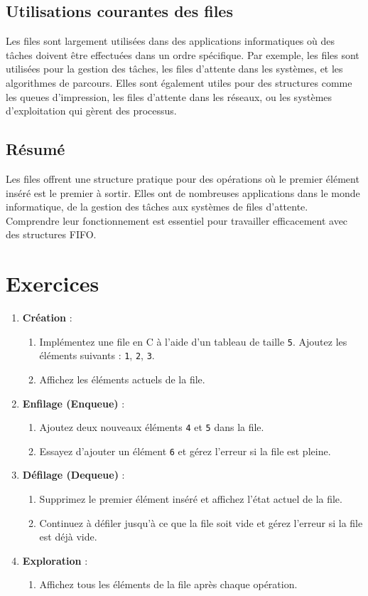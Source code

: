 \subsection{Utilisations courantes des files}
Les files sont largement utilisées dans des applications informatiques où des tâches doivent être effectuées dans un ordre spécifique. Par exemple, les files sont utilisées pour la gestion des tâches, les files d'attente dans les systèmes, et les algorithmes de parcours. Elles sont également utiles pour des structures comme les queues d'impression, les files d'attente dans les réseaux, ou les systèmes d'exploitation qui gèrent des processus.

\subsection{Résumé}
Les files offrent une structure pratique pour des opérations où le premier élément inséré est le premier à sortir. Elles ont de nombreuses applications dans le monde informatique, de la gestion des tâches aux systèmes de files d'attente. Comprendre leur fonctionnement est essentiel pour travailler efficacement avec des structures FIFO.

\section*{Exercices}
\begin{enumerate}
	\item \textbf{Création} :
	\begin{enumerate}
		\item Implémentez une file en C à l'aide d’un tableau de taille \texttt{5}. Ajoutez les éléments suivants : \texttt{1}, \texttt{2}, \texttt{3}.
		\item Affichez les éléments actuels de la file.
	\end{enumerate}
	
	\item \textbf{Enfilage (Enqueue)} :
	\begin{enumerate}
		\item Ajoutez deux nouveaux éléments \texttt{4} et \texttt{5} dans la file.
		\item Essayez d’ajouter un élément \texttt{6} et gérez l’erreur si la file est pleine.
	\end{enumerate}
	
	\item \textbf{Défilage (Dequeue)} :
	\begin{enumerate}
		\item Supprimez le premier élément inséré et affichez l’état actuel de la file.
		\item Continuez à défiler jusqu’à ce que la file soit vide et gérez l’erreur si la file est déjà vide.
	\end{enumerate}
	
	\item \textbf{Exploration} :
	\begin{enumerate}
		\item Affichez tous les éléments de la file après chaque opération.
	\end{enumerate}
\end{enumerate}


